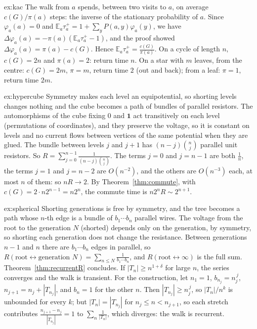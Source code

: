 \begin{solution}{ex:kac}
\idea The walk from $a$ spends, between two visits to $a$, on average $c(G)/\pi(a)$ steps: the inverse of the stationary probability of $a$.
\writeup Since $\varphi_a(a)=0$ and $\mathbb E_a\tau_a^+=1+\sum_yP(a,y)\varphi_a(y)$, we have $\Delta\varphi_a(a)=-\pi(a)(\mathbb E_a\tau_a^+-1)$, and the proof showed $\Delta\varphi_a(a)=\pi(a)-c(G)$. Hence $\mathbb E_a\tau_a^+=\frac{c(G)}{\pi(a)}$. On a cycle of length $n$,
$c(G)=2n$ and $\pi(a)=2$: return time $n$. On a star with $m$ leaves, from the centre: $c(G)=2m$, $\pi=m$, return time $2$ (out and back); from a leaf: $\pi=1$, return time $2m$.
\end{solution}

\begin{solution}{ex:hypercube}
\idea Symmetry makes each level an equipotential, so shorting levels changes nothing and the cube becomes a path of bundles of parallel resistors.
\writeup The automorphisms of the cube fixing $0$ and $\mathbf 1$ act transitively on each level (permutations of coordinates), and they preserve the voltage, so it is constant on levels and no current flows between vertices
of the same potential when they are glued. The bundle between levels $j$ and $j+1$ has $(n-j)\binom nj$ parallel unit resistors. So $R=\sum_{j=0}^{n-1}\frac1{(n-j)\binom nj}$. The terms $j=0$ and $j=n-1$ are both $\frac1n$, the terms
$j=1$ and $j=n-2$ are $O(n^{-2})$, and the others are $O(n^{-3})$ each, at most $n$ of them: so $nR\to2$. By Theorem~\ref{thm:commute}, with $c(G)=2\cdot n2^{n-1}=n2^n$, the commute time is $n2^nR\sim2^{n+1}$.
\end{solution}

\begin{solution}{ex:spherical}
\idea Shorting generations is free by symmetry, and the tree becomes a path whose $n$-th edge is a bundle of $b_1\cdots b_n$ parallel wires.
\writeup The voltage from the root to the generation $N$ (shorted) depends only on the generation, by symmetry, so shorting each generation does not change the resistance. Between generations $n-1$ and $n$ there are
$b_1\cdots b_n$ edges in parallel, so $R(\text{root}\leftrightarrow\text{generation }N)=\sum_{n\le N}\frac1{b_1\cdots b_n}$, and $R(\text{root}\leftrightarrow\infty)$ is the full sum. Theorem~\ref{thm:recurrentR} concludes. If $|T_n|\ge n^{1+\delta}$ for large $n$, the series converges and the walk is transient. For the construction, let
$n_1=1$, $b_{n_j}=n_j^{\,j}$, $n_{j+1}=n_j+|T_{n_j}|$, and $b_n=1$ for the other $n$. Then $|T_{n_j}|\ge n_j^{\,j}$, so $|T_n|/n^k$ is unbounded for every $k$; but $|T_n|=|T_{n_j}|$ for $n_j\le n<n_{j+1}$, so each stretch contributes
$\frac{n_{j+1}-n_j}{|T_{n_j}|}=1$ to $\sum_n\frac1{|T_n|}$, which diverges: the walk is recurrent.
\end{solution}

